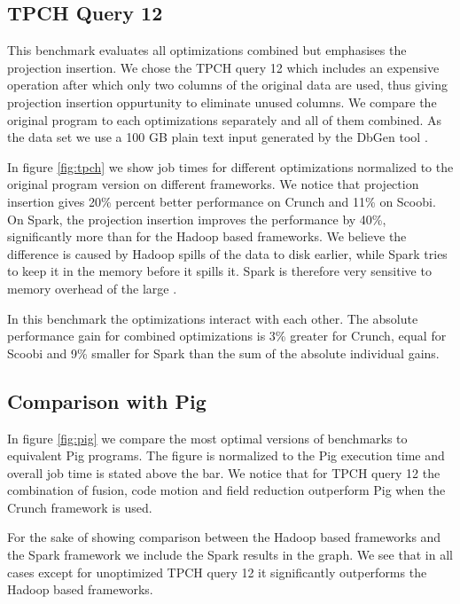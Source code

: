 \subsection{TPCH Query 12}
\label{subsec:tpch-query-12}

This benchmark evaluates all optimizations combined but emphasises the projection insertion. We chose the TPCH query 12 which includes an expensive  operation after which only two columns of the original data are used, thus giving projection insertion oppurtunity to eliminate unused columns. We compare the original program to each optimizations separately and all of them combined. As the data set we use a 100 GB plain text input generated by the DbGen tool \cite{tpch}.

In figure \ref{fig:tpch} we show job times for different optimizations normalized to the original program version on different frameworks. We notice that projection insertion gives 20\% percent better performance on Crunch and 11\% on Scoobi. On Spark, the projection insertion improves the performance by 40\%, significantly more than for the Hadoop based frameworks. We believe the difference is caused by Hadoop spills of the data to disk earlier, while Spark tries to keep it in the memory before it spills it. Spark is therefore very sensitive to memory overhead of the large .

In this benchmark the optimizations interact with each other. The absolute performance gain for combined optimizations is 3\% greater for Crunch, equal for Scoobi and 9\% smaller for Spark than the sum of the absolute individual gains.

\subsection{Comparison with Pig}
\label{subsec:pig}

In figure \ref{fig:pig} we compare the most optimal versions of benchmarks to equivalent Pig programs. The figure is normalized to the Pig execution time and overall job time is stated above the bar. We notice that for TPCH query 12 the combination of fusion, code motion and field reduction outperform Pig when the Crunch framework is used. 

For the sake of showing comparison between the Hadoop based frameworks and the Spark framework we include the Spark results in the graph. We see that in all cases except for unoptimized TPCH query 12 it significantly outperforms the Hadoop based frameworks.

